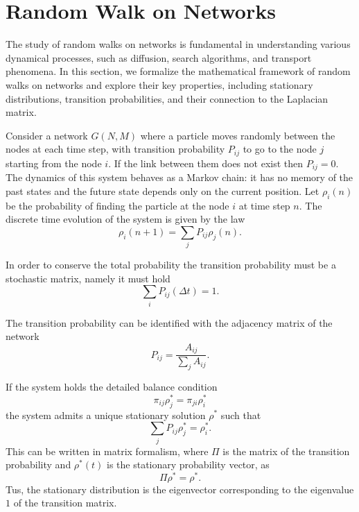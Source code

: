 \section{Random Walk on Networks}

The study of random walks on networks is fundamental in understanding various dynamical processes, such as diffusion, search algorithms, and transport phenomena. In this section, we formalize the mathematical framework of random walks on networks and explore their key properties, including stationary distributions, transition probabilities, and their connection to the Laplacian matrix.

Consider a network $G(N,M)$ where a particle moves randomly between the nodes at each time step, with transition probability $P_{ij}$ to go to the node $j$ starting from the node $i$. If the link between them does not exist then $P_{ij}= 0$. 
The dynamics of this system behaves as a Markov chain: it has no memory of the past states and the future state depends only on the current position.
Let $\rho_i(n)$ be the probability of finding the particle at the node $i$ at time step $n$. The discrete time evolution of the system is given by the law
\begin{equation}
    \rho_i(n+1) = \sum_j P_{ij}\rho_j(n).
\end{equation}

In order to conserve the total probability the transition probability must be a stochastic matrix, namely it must hold 
\begin{equation}
    \sum_i P_{ij}(\Delta t) = 1 .
\end{equation}

The transition probability can be identified with the adjacency matrix of the network
\begin{equation}
    P_{ij} = \frac{A_{ij}}{\sum_j A_{ij}}.
\end{equation}

If the system holds the detailed balance condition
\begin{equation}\label{detail_condition}
    \pi_{ij} \rho_j^* = \pi_{ji} \rho_i^*
\end{equation}
the system admits a unique stationary solution $\rho^*$ such that
\begin{equation}
    \sum_j P_{ij}\rho^*_j =  \rho^*_i .
\end{equation}
This can be written in matrix formalism, where $\Pi$ is the matrix of the transition probability and $\rho^*(t)$ is the stationary probability vector, as
\begin{equation}
    \Pi \rho^* = \rho^*.
\end{equation}
Tus, the stationary distribution is the eigenvector corresponding to the eigenvalue $1$ of the transition matrix.


